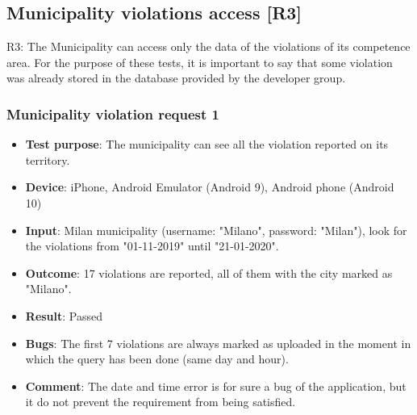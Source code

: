 \documentclass[../ATD.tex]{subfiles}
\begin{document}
    \subsection{Municipality violations access [R3]}\label{subsec:municipality-report-access}
    R3: The Municipality can access only the data of the violations of its competence area.
    \newline
    For the purpose of these tests, it is important to say that some violation was already stored in the database provided by the developer group.
    \subsubsection{Municipality violation request 1}\label{subsubsec:municiplaity-violation-request-1}
    \begin{itemize}
        \item \textbf{Test purpose}: The municipality can see all the violation reported on its territory.
        \item \textbf{Device}: iPhone, Android Emulator (Android 9), Android phone (Android 10)
        \item \textbf{Input}: Milan municipality (username: "Milano", password: "Milan"), look for the violations from "01-11-2019" until "21-01-2020".
        \item \textbf{Outcome}: 17 violations are reported, all of them with the city marked as "Milano".
        \item \textbf{Result}: Passed
        \item \textbf{Bugs}: The first 7 violations are always marked as uploaded in the moment in which the query has been done (same day and hour).
        \item \textbf{Comment}: The date and time error is for sure a bug of the application, but it do not prevent the requirement from being satisfied.
    \end{itemize}
\end{document}
